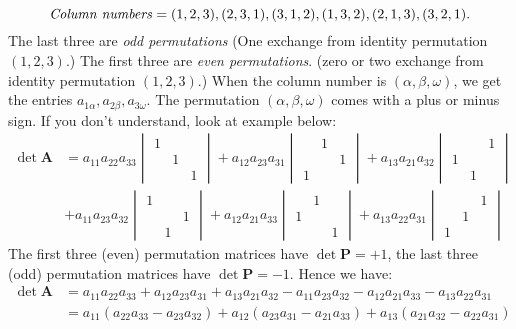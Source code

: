 \begin{example}
\[
\mbox{{\emph{Column numbers}}} = (1,2,3),(2,3,1),(3,1,2),(1,3,2),(2,1,3),(3,2,1).
\]
The last three are \textit{odd permutations} (One exchange from identity permutation $(1,2,3)$.) The first three are \textit{even permutations}. (zero or two exchange from identity permutation $(1,2,3)$.) When the column number is $(\alpha,\beta,\omega)$, we get the entries $a_{1\alpha},a_{2\beta},a_{3\omega}$.  The permutation $(\alpha,\beta,\omega)$ comes with a plus or minus sign. If you don't understand, look at example below:
\[
\begin{aligned}
\det\bm A&=
a_{11}a_{22}a_{33}\begin{vmatrix}
1&&\\&1&\\&&1
\end{vmatrix}
+
a_{12}a_{23}a_{31}\begin{vmatrix}
&1&\\&&1\\1&&
\end{vmatrix}
+
a_{13}a_{21}a_{32}\begin{vmatrix}
&&1\\1&&\\&1&
\end{vmatrix}\\&+
a_{11}a_{23}a_{32}\begin{vmatrix}
1&&\\&&1\\&1&
\end{vmatrix}
+
a_{12}a_{21}a_{33}\begin{vmatrix}
&1&\\1&&\\&&1
\end{vmatrix}
+
a_{13}a_{22}a_{31}\begin{vmatrix}
&&1\\&1&\\1&&
\end{vmatrix}
\end{aligned}
\]
The first three (even) permutation matrices have $\det\bm P=+1$, the last three (odd) permutation matrices have $\det\bm P=-1$. Hence we have:
\[
\begin{aligned}
\det\bm A&=a_{11}a_{22}a_{33}+
a_{12}a_{23}a_{31}+
a_{13}a_{21}a_{32}-
a_{11}a_{23}a_{32}-
a_{12}a_{21}a_{33}-
a_{13}a_{22}a_{31}\\
&=a_{11}(a_{22}a_{33} - a_{23}a_{32})+a_{12}(a_{23}a_{31}-a_{21}a_{33})+a_{13}(a_{21}a_{32}-a_{22}a_{31})
\end{aligned}
\]
\end{example}
